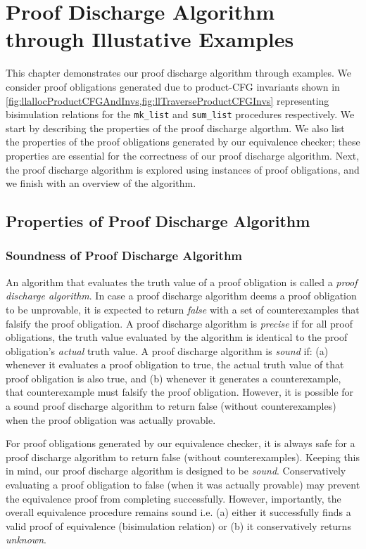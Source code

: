 \chapter{Proof Discharge Algorithm through Illustative Examples}
\label{sec:examples}
This chapter demonstrates our proof discharge algorithm through examples.
We consider proof obligations generated due to product-CFG invariants shown in \cref{fig:llallocProductCFGAndInvs,fig:llTraverseProductCFGInvs}
representing bisimulation relations for the {\tt mk\_list} and {\tt sum\_list} procedures respectively.
We start by describing the properties of the proof discharge algorthm.
We also list the properties of the proof obligations generated by our equivalence checker;
these properties are essential for the correctness of our proof discharge algorithm.
Next, the proof discharge algorithm is explored using instances of proof obligations,
and we finish with an overview of the algorithm.

\section{Properties of Proof Discharge Algorithm}
\label{sec:proofalgoprops}

\subsection{Soundness of Proof Discharge Algorithm}
\label{sec:proofalgosound}
An algorithm that evaluates the truth value of a proof obligation is called a
{\em proof discharge algorithm}.
In case a proof discharge algorithm deems a proof obligation to be unprovable,
it is expected to return {\em false} with a set of counterexamples that falsify
the proof obligation.
A proof discharge algorithm is {\em precise} if for all proof obligations,
the truth value evaluated by the algorithm is identical to the proof obligation's
{\em actual} truth value.
A proof discharge algorithm is {\em sound} if:
(a) whenever it evaluates a proof obligation to true,
the actual truth value of that proof obligation is also true,
and (b) whenever it generates a counterexample, that counterexample
must falsify the proof obligation.
However, it is possible for a sound proof discharge algorithm to return false
(without counterexamples) when the proof obligation was actually provable.

For proof obligations generated by our equivalence checker,
it is always safe for a proof discharge algorithm to return false (without counterexamples).
Keeping this in mind, our proof discharge algorithm is designed to be {\em sound}.
Conservatively evaluating a proof obligation to false (when it was actually provable)
may prevent the equivalence proof from completing successfully.
However, importantly, the overall equivalence procedure remains sound i.e.
(a) either it successfully finds a valid proof of equivalence (bisimulation relation)
or (b) it conservatively returns {\em unknown}.

